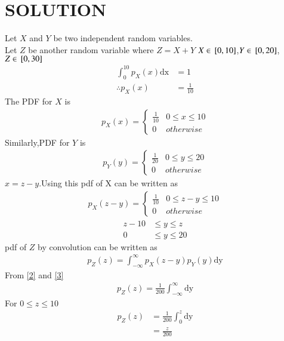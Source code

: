 \documentclass[journal,12pt,twocolumn]{IEEEtran}
\begin{document}
\section*{SOLUTION}
Let $X$ and $Y$ be two independent random variables. \\
Let $Z$ be another random variable where $Z=X+Y$
$X \in {}\left[0,10\right]$,$Y \in {}\left[0,20\right]$,$Z \in {}\left[0,30\right]$
\begin{align}
\int_{0}^{10} p_X(x) \mathrm{dx} &=1  \\
\therefore p_X(x)&=\frac{1}{10} \label{px}
\end{align}
The PDF for $X$ is
\begin{align}
p_X(x)  = 
\begin{cases}
     \frac{1}{10} & 0 \leq x \leq 10\\
     0 & otherwise \label{1}
\end{cases}
\end{align}
Similarly,PDF for $Y$ is
\begin{align}
p_{Y}(y)  = 
\begin{cases}
     \frac{1}{20} & 0 \leq y \leq 20 \\
      0 & otherwise \label{2}
\end{cases}
\end{align}
$x=z-y$.Using this pdf of X can be written as
\begin{align}
p_X(z-y)  = 
\begin{cases}
    \frac{1}{10} & 0 \leq z-y \leq 10\\
    0 & otherwise \label{3}
\end{cases}
\end{align}
\begin{align}
   z-10 &\leq y \leq z \label{4} \\
   0 &\leq y \leq 20 \label{5}
\end{align}
pdf of $Z$ by convolution can be written as
\begin{align}
 p_Z(z) =  \int_{- \infty}^{\infty} p_X(z-y)p_Y(y) \mathrm{dy} \label{pz}
\end{align}
From \ref{2} and \ref{3}
\begin{align}
 p_Z(z) = \frac{1}{200} \int_{- \infty}^{\infty} \mathrm{dy} \label{6}
\end{align}
For $0 \leq z \leq 10$  
\begin{align}
p_Z(z) &= \frac{1}{200}  \int_{0}^{z}\mathrm{dy}  \\
       &= \frac{z}{200} \label{7}
\end{align}
\end{document}
